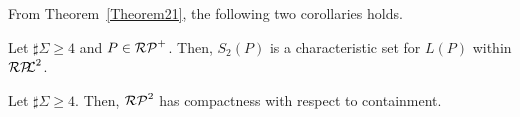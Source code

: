 From Theorem~\ref{Theorem21}, %
the following two corollaries holds.


\begin{col}
    Let $\sharp\Sigma \geq 4$ and $P \in \mathcal{RP}^{+}$.
    Then, $S_{2}(P)$ is a characteristic set for $L(P)$ within $\mathcal{RP\!\!L}^{2}$.
\end{col}


\begin{col}
    Let $\sharp\Sigma \geq 4$.
    Then, $\mathcal{RP}^{2}$ has compactness with respect to containment.
\end{col}
